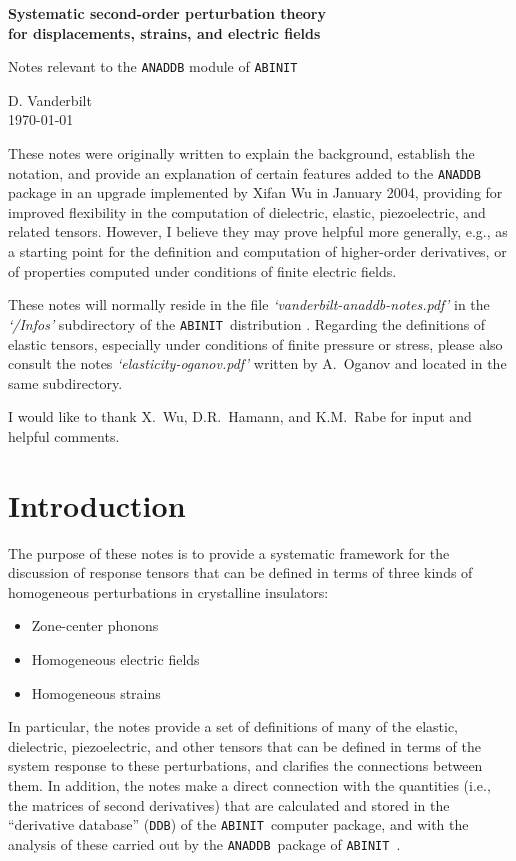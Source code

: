 \documentclass[11pt,fleqn]{article}
\def\ABINIT{{{\tt ABINIT}}}
\def\ANADDB{{\tt ANADDB}}
\def\DDB{{\tt DDB}}
\begin{document}
\begin{center}
{\Large\bf
Systematic second-order perturbation theory\\
\baselineskip 20pt
for displacements, strains, and electric fields
}
\large
\par\bigskip
Notes relevant to the {\tt ANADDB} module of {\tt ABINIT}
\par\medskip
D. Vanderbilt\\
\today
\end{center}


\bigskip
These notes were originally written to explain the background,
establish the notation, and provide an explanation of certain
features added to the \ANADDB\ \cite{abi} package in an upgrade implemented by
Xifan Wu in January 2004, providing for improved flexibility in the
computation of dielectric, elastic, piezoelectric, and related
tensors.  However, I believe they may prove helpful more generally,
e.g., as a starting point for the definition and computation of
higher-order derivatives, or of properties computed under conditions
of finite electric fields.

These notes will normally reside in the file {\sl `vanderbilt-anaddb-notes.pdf'}
in the {\sl `/Infos'} subdirectory of the \ABINIT\ distribution \cite{abi}.
Regarding the definitions of elastic tensors, especially under
conditions of finite pressure or stress, please also consult
the notes {\sl `elasticity-oganov.pdf'} \cite{oganov} written by A.~Oganov
and located in the same subdirectory.

I would like to thank X.~Wu, D.R.~Hamann, and K.M.~Rabe for input
and helpful comments.

\section{Introduction}

The purpose of these notes is to provide a systematic framework for
the discussion of response tensors that can be defined in terms of
three kinds of homogeneous perturbations in crystalline insulators:
\begin{itemize}
\item Zone-center phonons
\item Homogeneous electric fields
\item Homogeneous strains
\end{itemize}
In particular, the notes provide a set of definitions of many of
the elastic, dielectric, piezoelectric, and other tensors that
can be defined in terms of the system response to these
perturbations, and clarifies the connections between them.
In addition, the notes make a direct connection with the quantities
(i.e., the matrices of second derivatives) that are calculated and
stored in the ``derivative database'' (\DDB) of the
\ABINIT\ computer package, and with the analysis
of these carried out by the \ANADDB\ package of \ABINIT\ 
\cite{abi}.
\end{document}
